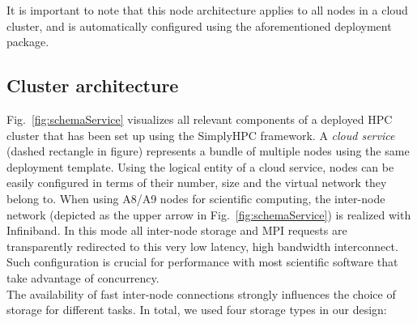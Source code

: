 \documentclass[3p,times]{elsarticle}
\begin{document}
It is important to note that this node architecture applies to all nodes in a cloud cluster, and is automatically configured using the aforementioned deployment package. 

\subsection{Cluster architecture}

Fig.~\ref{fig:schemaService} visualizes all relevant components of a deployed HPC cluster that has been set up using the SimplyHPC framework. 
A \textit{cloud service} (dashed rectangle in figure) represents a bundle of multiple nodes using the same deployment template. Using the logical entity of a cloud service, nodes can be easily configured in terms of their number, size and the virtual network they belong to. When using A8/A9 nodes for scientific computing, the inter-node network (depicted as the upper arrow in Fig.~\ref{fig:schemaService}) is realized with Infiniband. In this mode all inter-node storage and MPI requests are transparently redirected to this very low latency, high bandwidth interconnect. Such configuration is crucial for performance with most scientific software that take advantage of concurrency.\\
The availability of fast inter-node connections strongly influences the choice of storage for different tasks. In total, we used four storage types in our design:
\end{document}
